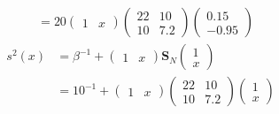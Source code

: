 \documentclass{article}
\begin{document}
\begin{enumerate}
\begin{align*}
&= 20\begin{pmatrix}1 & x\end{pmatrix}\begin{pmatrix}22 & 10 \\ 10 & 7.2\end{pmatrix}\begin{pmatrix}0.15 \\ -0.95\end{pmatrix} 
\end{align*}
\begin{align*}
s^2(x) &= \beta^{-1} + \begin{pmatrix}1 & x\end{pmatrix}\bm{S}_N\begin{pmatrix} 1 \\ x \end{pmatrix} \\
&= 10^{-1} + \begin{pmatrix}1 & x\end{pmatrix}\begin{pmatrix}22 & 10 \\ 10 & 7.2\end{pmatrix}\begin{pmatrix} 1 \\ x \end{pmatrix}
\end{align*}
\end{enumerate}
\end{document}
